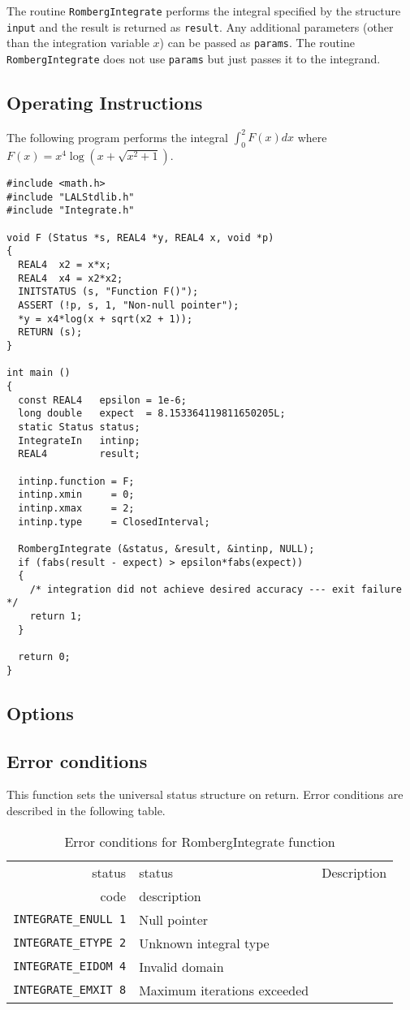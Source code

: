 \documentclass{article}
\begin{document}
The routine \verb+RombergIntegrate+ performs the integral specified by the
structure \verb+input+ and the result is returned as \verb+result+.  Any
additional parameters (other than the integration variable $x$) can be passed
as \verb+params+.  The routine \verb+RombergIntegrate+ does not use
\verb+params+ but just passes it to the integrand.

\subsection{Operating Instructions}

The following program performs the integral $\int_0^2F(x)dx$ where
$F(x)=x^4\log(x+\sqrt{x^2+1})$.

\begin{verbatim}
#include <math.h>
#include "LALStdlib.h"
#include "Integrate.h"

void F (Status *s, REAL4 *y, REAL4 x, void *p)
{
  REAL4  x2 = x*x;
  REAL4  x4 = x2*x2;
  INITSTATUS (s, "Function F()");
  ASSERT (!p, s, 1, "Non-null pointer");
  *y = x4*log(x + sqrt(x2 + 1));
  RETURN (s);
}

int main ()
{
  const REAL4   epsilon = 1e-6;
  long double   expect  = 8.153364119811650205L;
  static Status status;
  IntegrateIn   intinp;
  REAL4         result;

  intinp.function = F;
  intinp.xmin     = 0;
  intinp.xmax     = 2;
  intinp.type     = ClosedInterval;

  RombergIntegrate (&status, &result, &intinp, NULL);
  if (fabs(result - expect) > epsilon*fabs(expect))
  {
    /* integration did not achieve desired accuracy --- exit failure */
    return 1;
  }

  return 0;
}
\end{verbatim}

\subsection{Options}

\subsection{Error conditions}

This function sets the universal status structure on return.
Error conditions are described in the following table.

\begin{table}
\begin{tabular}{|r|l|p{2in}|}\hline
status  & status          & Description\\
code    & description     & \\\hline
\verb+INTEGRATE_ENULL 1+ & Null pointer & \\
\verb+INTEGRATE_ETYPE 2+ & Unknown integral type & \\
\verb+INTEGRATE_EIDOM 4+ & Invalid domain & \\
\verb+INTEGRATE_EMXIT 8+ & Maximum iterations exceeded & \\
\hline
\end{tabular}
\caption{Error conditions for RombergIntegrate function}\label{tbl:CV}
\end{table}
\end{document}
